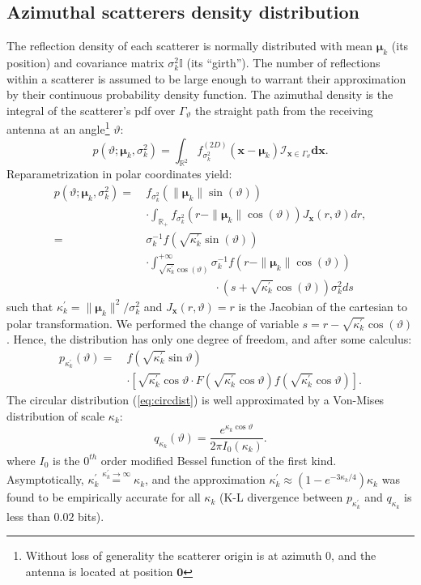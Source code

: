 \documentclass[journal,10pt]{IEEEtran}
\providecommand{\Rspace}{\mathbb{R}}
\providecommand{\vct}[1]{\boldsymbol{#1}}
\begin{document}
\subsection{Azimuthal scatterers density distribution}
The reflection density of each scatterer is normally distributed with mean $\vct\mu_k$ (its position) and covariance matrix $\sigma_k^2\mathbb I$ (its ``girth''). The number of reflections within a scatterer is assumed to be large enough to warrant their approximation by their continuous probability density function. The azimuthal  density is the integral of the scatterer's pdf over $\Gamma_\vartheta$ the straight path from the receiving antenna at an angle\footnote{Without loss of generality the scatterer origin is at azimuth $0$, and the antenna is located at position $\vct 0$} $\vartheta$:
\begin{equation}
p(\vartheta;\vct \mu_k, \sigma_k^2)=\int_{\Rspace^2}f^{(2D)}_{\sigma_k^2}(\vct x -\vct\mu_k)\mathcal I_{\vct x\in\Gamma_\vartheta}\vct{dx}.
\end{equation}
Reparametrization in polar coordinates yield:
\begin{align*}
p(\vartheta;\vct \mu_k, \sigma_k^2)=\: &f_{\sigma_k^2}(\|\vct\mu_k\|\sin(\vartheta))\\ &\cdot\int_{\Rspace_+}f_{\sigma_k^2}(r-\|\vct\mu_k\|\cos(\vartheta))J_{\vct x}(r,\vartheta)dr,\\
=\: &\sigma_k^{-1}f\left(\sqrt{\kappa^\prime_k}\sin(\vartheta)\right)\\ &\cdot\int_{\sqrt{\kappa^\prime_k}\cos(\vartheta)}^{+\infty}\sigma_k^{-1}f(r-\|\vct\mu_k\|\cos(\vartheta))\\ & \qquad\qquad\qquad\cdot (s+\sqrt{\kappa^\prime_k}\cos(\vartheta))\sigma_k^2 ds
\end{align*}
such that $\kappa^\prime_k=\|\vct\mu_k\|^2/\sigma_k^2$ and $J_{\vct x}(r,\vartheta)=r$ is the Jacobian of the cartesian to polar transformation. We performed the change of variable $s=r-\sqrt{\kappa^\prime_k}\cos(\vartheta)$.
Hence, the distribution has only one degree of freedom, and after some calculus:
\begin{align}\label{eq:circdist}
p_{\kappa^\prime_k}(\vartheta)=\: &f(\sqrt{\kappa^\prime_k}\sin\vartheta)\\ &\cdot\left[\sqrt{\kappa^\prime_k}\cos\vartheta\cdot F(\sqrt{\kappa^\prime_k}\cos\vartheta)f(\sqrt{\kappa^\prime_k}\cos\vartheta)\right].\nonumber	
\end{align}
The circular distribution (\ref{eq:circdist}) is well approximated by a Von-Mises distribution of scale $\kappa_k$:
\begin{equation}
q_{\kappa_k}(\vartheta)=\frac{e^{\kappa_k\cos\vartheta}}{2\pi I_0(\kappa_k)}.
\end{equation}
where $I_0$ is the $0^{th}$ order modified Bessel function of the first kind. Asymptotically, $\kappa^\prime_k\overset{\kappa^\prime_k\rightarrow \infty}{=}\kappa_k$, and the approximation $\kappa^\prime_k\approx (1-e^{-3\kappa_k/4})\kappa_k$ was found to be empirically accurate for all $\kappa_k$ (K-L divergence between $p_{\kappa^\prime_k}$ and $q_{\kappa_k}$ is less than $0.02$ bits). 
\end{document}
